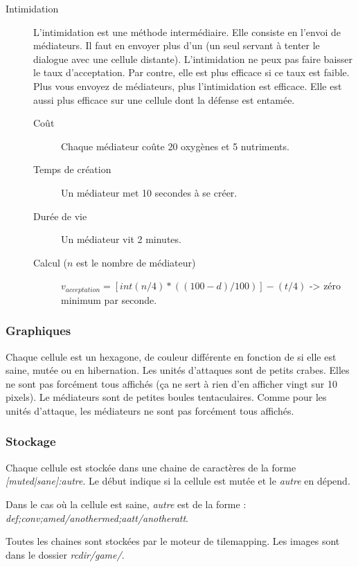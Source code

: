 \documentclass{article}
\begin{document}
\begin{description}
	\item[Intimidation]\label{intimi}
		L'intimidation est une méthode intermédiaire. Elle consiste en l'envoi de médiateurs. Il faut en envoyer plus d'un (un seul servant à tenter le dialogue avec une cellule distante). L'intimidation ne peux pas faire baisser le taux d'acceptation. Par contre, elle est plus efficace si ce taux est faible. Plus vous envoyez de médiateurs, plus l'intimidation est efficace. Elle est aussi plus efficace sur une cellule dont la défense est entamée.
		\begin{description}
			\item[Coût] Chaque médiateur coûte 20 oxygènes et 5 nutriments.
			\item[Temps de création] Un médiateur met 10 secondes à se créer.
			\item[Durée de vie] Un médiateur vit 2 minutes.
			\item[Calcul ($n$ est le nombre de médiateur)] $v_{acceptation} = [int(n/4) * ((100-d) / 100)] - (t/4)$ -> zéro minimum par seconde.
		\end{description}
\end{description}

\subsubsection{Graphiques}
Chaque cellule est un hexagone, de couleur différente en fonction de si elle est saine, mutée ou en hibernation. Les unités d'attaques sont de petits crabes. Elles ne sont pas forcément tous affichés (ça ne sert à rien d'en afficher vingt sur 10 pixels). Le médiateurs sont de petites boules tentaculaires. Comme pour les unités d'attaque, les médiateurs ne sont pas forcément tous affichés.

\subsubsection{Stockage}
Chaque cellule est stockée dans une chaine de caractères de la forme \emph{[muted|sane]:autre}. Le début indique si la cellule est mutée et le \emph{autre} en dépend. %

Dans le cas où la cellule est saine, \emph{autre} est de la forme : \emph{def;conv;amed/anothermed;aatt/anotheratt}.

Toutes les chaines sont stockées par le moteur de tilemapping. Les images sont dans le dossier \emph{rcdir/game/}.
\end{document}
